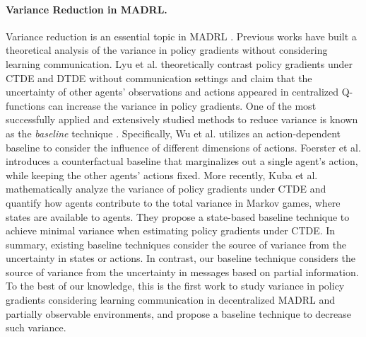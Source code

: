 \paragraph{\textnormal{\textbf{Variance Reduction in MADRL}}.} Variance reduction is an essential topic in MADRL \cite{Tucker2018Baseline,Kuba2021Setting}. Previous works have built a theoretical analysis of the variance in policy gradients without considering learning communication. Lyu et al. \cite{Lyu2021Contrasting,Lyu2023Centralized} theoretically contrast policy gradients under CTDE and DTDE without communication settings and claim that the uncertainty of other agents' observations and actions appeared in centralized Q-functions can increase the variance in policy gradients. One of the most successfully applied and extensively studied methods to reduce variance is known as the \textit{baseline} technique \cite{Wu2018Baseline,Foerster2018COMA,Kuba2021Setting}. Specifically, Wu et al. \cite{Wu2018Baseline} utilizes an action-dependent baseline to consider the influence of different dimensions of actions. Foerster et al. \cite{Foerster2018COMA} introduces a counterfactual baseline that marginalizes out a single agent’s action, while keeping the other agents’ actions fixed. More recently, Kuba et al. \cite{Kuba2021Setting} mathematically analyze the variance of policy gradients under CTDE and quantify how agents contribute to the total variance in Markov games, where states are available to agents. They propose a state-based baseline technique to achieve minimal variance when estimating policy gradients under CTDE. In summary, existing baseline techniques consider the source of variance from the uncertainty in states or actions. In contrast, our baseline technique considers the source of variance from the uncertainty in messages based on partial information. To the best of our knowledge, this is the first work to study variance in policy gradients considering learning communication in decentralized MADRL and partially observable environments, and propose a baseline technique to decrease such variance.